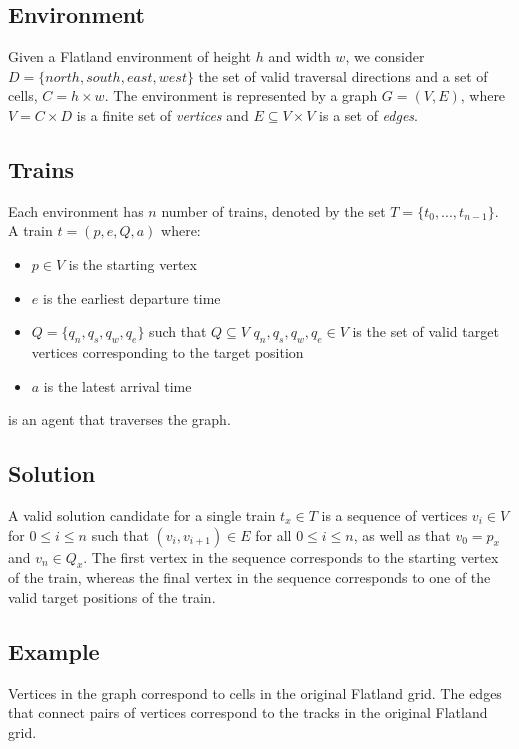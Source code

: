 \subsection{Environment}\label{sec:environment}
Given a Flatland environment of height $h$ and width $w$, we consider $D = \{north,south,east,west\}$ the set of valid traversal directions and a set of cells, $C = h \times w$.  
The environment is represented by a graph $G = (V,E)$, where $V = C \times D$ is a finite set of \textit{vertices} and $E \subseteq V \times V$ is a set of \textit{edges}.



\subsection{Trains}\label{sec:trains}
Each environment has $n$ number of trains, denoted by the set $T = \{t_0,...,t_{n-1}\}$.  A train $t = (p, e, Q, a)$ where:
\begin{itemize}
	\item $p \in V$ is the starting vertex
	\item $e$ is the earliest departure time
	\item $Q=\{q_n, q_s, q_w, q_e\}$ such that $Q \subseteq V$ $q_n, q_s, q_w, q_e \in V$ is the set of valid target vertices corresponding to the target position
	\item $a$ is the latest arrival time
\end{itemize}

\noindent is an agent that traverses the graph.

\subsection{Solution}\label{sec:solution}
A valid solution candidate for a single train $t_x \in T$ is a sequence of vertices $v_i \in V$ for $0 \leq i \leq n$ such that $(v_i,v_{i+1}) \in E$ for all $0 \leq i \leq n$, as well as that $v_{0} = p_x$ and $v_{n} \in Q_x$.  The first vertex in the sequence corresponds to the starting vertex of the train, whereas the final vertex in the sequence corresponds to one of the valid target positions of the train.


\subsection{Example}\label{sec:example}
Vertices in the graph correspond to cells in the original Flatland grid.  The edges that connect pairs of vertices correspond to the tracks in the original Flatland grid.  



